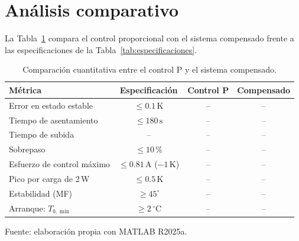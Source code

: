 \section{Análisis comparativo}\label{sec:comparacion}
La Tabla~\ref{tab:comparacion} compara el control proporcional con el sistema compensado frente a las especificaciones de la Tabla~\ref{tab:especificaciones}. 

\begin{table}[!tbp]\centering
\caption{Comparación cuantitativa entre el control P y el sistema compensado.}\label{tab:comparacion}
{\tableformat
\begin{tabular}{@{}lccc@{}}\toprule
Métrica & Especificación & Control P & Compensado\\\midrule
Error en estado estable & $\le0.1\,\mathrm K$ & -- & --\\
Tiempo de asentamiento & $\le180\,\mathrm s$ & -- & --\\
Tiempo de subida & -- & -- & --\\
Sobrepaso & $\le10\,\%$ & -- & --\\
Esfuerzo de control máximo & $\le0.81\,\mathrm A$ ($-1\,\mathrm K$) & -- & --\\
Pico por carga de 2\,W & $\le0.5\,\mathrm K$ & -- & --\\
Estabilidad (MF) & $\ge45^\circ$ & -- & --\\
Arranque: $T_{b,\min}$ & $\ge2\,^\circ\mathrm C$ & -- & --\\\bottomrule
\end{tabular}}
\par\smallskip\footnotesize Fuente: elaboración propia con MATLAB R2025a.
\end{table}

